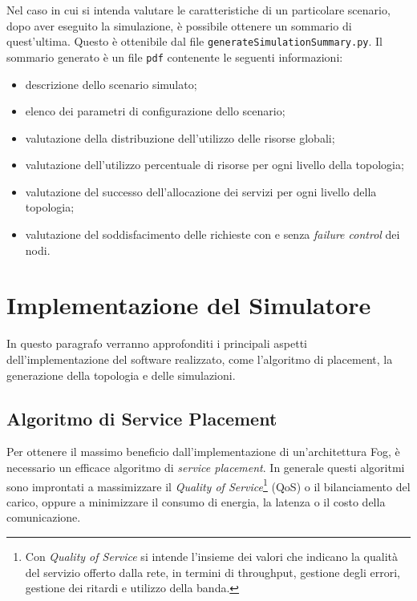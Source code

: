 Nel caso in cui si intenda valutare le caratteristiche di un particolare scenario, dopo aver eseguito la simulazione, è possibile ottenere un sommario di quest'ultima. Questo è ottenibile dal file \texttt{generateSimulationSummary.py}. Il sommario generato è un file \texttt{pdf} contenente le seguenti informazioni:
\begin{itemize}
	\item descrizione dello scenario simulato;
	\item elenco dei parametri di configurazione dello scenario;
	\item valutazione della distribuzione dell'utilizzo delle risorse globali;
	\item valutazione dell'utilizzo percentuale di risorse per ogni livello della topologia;
	\item valutazione del successo dell'allocazione dei servizi per ogni livello della topologia;
	\item valutazione del soddisfacimento delle richieste con e senza \textit{failure control} dei nodi.
\end{itemize}

\section{Implementazione del Simulatore}

In questo paragrafo verranno approfonditi i principali aspetti dell'implementazione del software realizzato, come l'algoritmo di placement, la generazione della topologia e delle simulazioni.

\subsection{Algoritmo di Service Placement}

Per ottenere il massimo beneficio dall'implementazione di un'architettura Fog, è necessario un efficace algoritmo di \textit{service placement}. In generale questi algoritmi sono improntati a massimizzare il \textit{Quality of Service}\footnote{Con \textit{Quality of Service} si intende l'insieme dei valori che indicano la qualità del servizio offerto dalla rete, in termini di throughput, gestione degli errori, gestione dei ritardi e utilizzo della banda.} (QoS) o il bilanciamento del carico, oppure a minimizzare il consumo di energia, la latenza o il costo della comunicazione.

